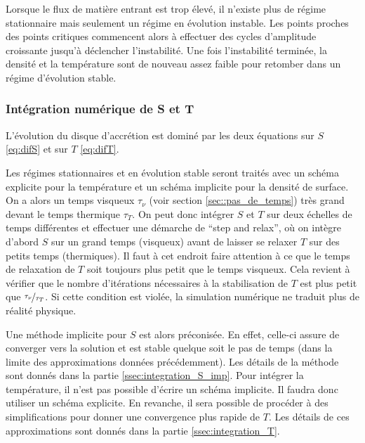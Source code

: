 Lorsque le flux de matière entrant est trop élevé, il n'existe plus de régime stationnaire mais seulement un régime en évolution instable. Les points proches des points critiques commencent alors à effectuer des cycles d'amplitude croissante jusqu'à déclencher l'instabilité. Une fois l'instabilité terminée, la densité et la température sont de nouveau assez faible pour retomber dans un régime d'évolution stable.

\subsubsection{Intégration numérique de S et T}

L'évolution du disque d'accrétion est dominé par les deux équations sur $S$ \eqref{eq:difS} et sur $T$ \eqref{eq:difT}.

Les régimes stationnaires et en évolution stable seront traités avec un schéma explicite pour la température et un schéma implicite pour la densité de surface. On a alors un temps visqueux $\tau_\nu$  (voir section \ref{sec::pas_de_temps}) très grand devant le temps thermique $\tau_T$. On peut donc intégrer $S$ et $T$ sur deux échelles de temps différentes et effectuer une démarche de ``step and relax'', où on intègre d'abord $S$ sur un grand temps (visqueux) avant de laisser se relaxer $T$ sur des petits temps (thermiques). Il faut à cet endroit faire attention à ce que le temps de relaxation de $T$ soit toujours plus petit que le temps visqueux. Cela revient à vérifier que le nombre d'itérations nécessaires à la stabilisation de $T$ est plus petit que $\nicefrac{\tau_\nu}{\tau_T}$. Si cette condition est violée, la simulation numérique ne traduit plus de réalité physique. 

Une méthode implicite pour $S$ est alors préconisée. En effet, celle-ci assure de converger vers la solution et est stable quelque soit le pas de temps (dans la limite des approximations données précédemment). Les détails de la méthode sont donnés dans la partie \ref{ssec:integration_S_imp}. Pour intégrer la température, il n'est pas possible d'écrire un schéma implicite. Il faudra donc utiliser un schéma explicite. En revanche, il sera possible de procéder à des simplifications pour donner une convergence plus rapide de $T$. Les détails de ces approximations sont donnés dans la partie \ref{ssec:integration_T}.

